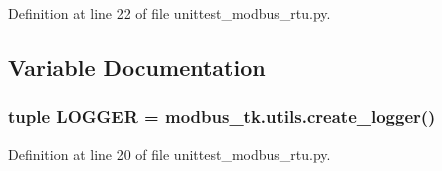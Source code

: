 Definition at line 22 of file unittest\+\_\+modbus\+\_\+rtu.\+py.



\subsection{Variable Documentation}
\subsubsection[{L\+O\+G\+G\+E\+R}]{\setlength{\rightskip}{0pt plus 5cm}tuple L\+O\+G\+G\+E\+R = {\bf modbus\+\_\+tk.\+utils.\+create\+\_\+logger}()}\label{namespacetests_1_1unittest__modbus__rtu_ae9c29667350ae00a0837fc1e77c279e2}


Definition at line 20 of file unittest\+\_\+modbus\+\_\+rtu.\+py.


